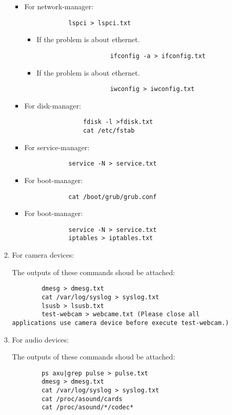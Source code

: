 \documentclass[a4paper,10pt]{article}
\begin{document}
\begin{itemize}
\begin{enumerate}
	\begin{itemize}
		\item For network-manager:
			\begin{verbatim}
			lspci > lspci.txt
			\end{verbatim}
			\begin{itemize}
  			\item If the problem is about ethernet.
				\begin{verbatim}
    				ifconfig -a > ifconfig.txt
				\end{verbatim}
  			\item If the problem is about ethernet.
				\begin{verbatim}
    				iwconfig > iwconfig.txt
				\end{verbatim}
			\end{itemize}
		\item For disk-manager:
			\begin{verbatim}
		    	fdisk -l >fdisk.txt
    			cat /etc/fstab
			\end{verbatim}
		\item For service-manager:
			\begin{verbatim}
			service -N > service.txt
			\end{verbatim}
		\item For boot-manager:
			\begin{verbatim}
			cat /boot/grub/grub.conf
			\end{verbatim}
		\item For boot-manager:
			\begin{verbatim}
			service -N > service.txt
			iptables > iptables.txt
			\end{verbatim}
	\end{itemize}
	\item  For camera devices:
		
		The outputs of these commands shoud be attached:
		\begin{verbatim}
		dmesg > dmesg.txt
		cat /var/log/syslog > syslog.txt
		lsusb > lsusb.txt
		test-webcam > webcame.txt (Please close all applications use camera device before execute test-webcam.)
		\end{verbatim}
	\item  For audio devices:

		The outputs of these commands shoud be attached:
		\begin{verbatim}
		ps axu|grep pulse > pulse.txt
		dmesg > dmesg.txt
		cat /var/log/syslog > syslog.txt
		cat /proc/asound/cards
		cat /proc/asound/*/codec*
		\end{verbatim}
	\end{enumerate}
\end{itemize}
\end{document}
